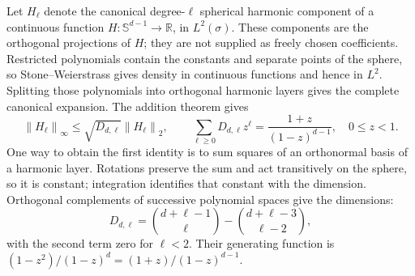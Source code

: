 \documentclass[11pt,letterpaper]{article}
\newcommand{\R}{\mathbb R}
\newcommand{\norm}[1]{\left\lVert#1\right\rVert}
\newcommand{\Sph}{\mathbb S^{d-1}}
\theoremstyle{definition}
\theoremstyle{remark}
\begin{document}
Let \(H_\ell\) denote the canonical degree-\(\ell\) spherical harmonic
component of a continuous function \(H:\Sph\to\R\), in \(L^2(\sigma)\).
These components are the orthogonal projections of \(H\); they are not supplied
as freely chosen coefficients. Restricted polynomials contain the constants
and separate points of the sphere, so Stone--Weierstrass gives density in
continuous functions and hence in \(L^2\). Splitting those polynomials into
orthogonal harmonic layers gives the complete canonical expansion.
The addition theorem gives
\begin{equation}\label{eq:addition}
 \norm{H_\ell}_\infty\le\sqrt{D_{d,\ell}}\norm{H_\ell}_2,\qquad
 \sum_{\ell\ge0}D_{d,\ell}z^\ell=\frac{1+z}{(1-z)^{d-1}},\quad 0\le z<1.
\end{equation}
One way to obtain the first identity is to sum squares of an orthonormal
basis of a harmonic layer. Rotations preserve the sum and act transitively
on the sphere, so it is constant; integration identifies that constant with
the dimension. Orthogonal complements of successive polynomial spaces give
the dimensions:
\[
 D_{d,\ell}=\binom{d+\ell-1}{\ell}-\binom{d+\ell-3}{\ell-2},
\]
with the second term zero for \(\ell<2\). Their generating function is
\((1-z^2)/(1-z)^d=(1+z)/(1-z)^{d-1}\).
\end{document}
